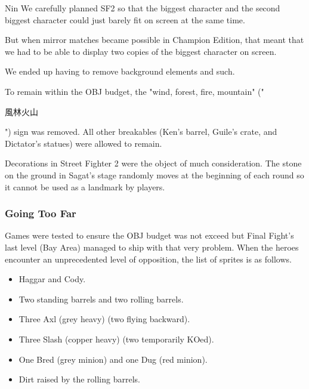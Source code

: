 \begin{q}{Nin}
We carefully planned SF2 so that the biggest character and the second biggest character could just barely fit on screen at the same time. 

But when mirror matches became possible in Champion Edition, that meant that we had to be able to display two copies of the biggest character on screen. 

We ended up having to remove background elements and such.
\end{q}

To remain within the OBJ budget, the "wind, forest, fire, mountain" ("\begin{CJK}{UTF8}{min}風林火山\end{CJK}") sign was removed. All other breakables (Ken's barrel, Guile's crate, and Dictator's statues) were allowed to remain.

\begin{trivia}
Decorations in Street Fighter 2 were the object of much consideration. The stone on the ground in Sagat's stage randomly moves at the beginning of each round so it cannot be used as a landmark by players.

\end{trivia}

\vfill
{}




\subsubsection{Going Too Far} \label{going_too_far}
Games were tested to ensure the OBJ budget was not exceed but Final Fight's last level (Bay Area) managed to ship with that very problem. When the heroes encounter an unprecedented level of opposition, the list of sprites is as follows\cite{ffoverload}.

\begin{itemize}[topsep=0pt]
\item Haggar and Cody.
\item Two standing barrels and two rolling barrels.
\item Three Axl (grey heavy) (two flying backward).
\item Three Slash (copper heavy) (two temporarily KOed).
\item One Bred (grey minion) and one Dug (red minion).
\item Dirt raised by the rolling barrels.
\end{itemize}

